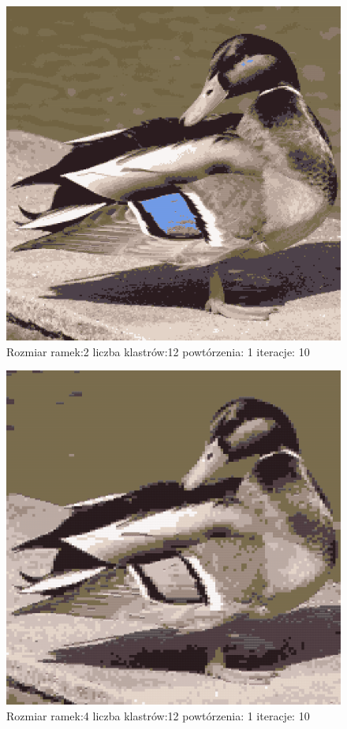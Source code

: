 \documentclass{classrep}
\begin{document}
{{{{\begin{figure}[!htbp]
\centering
\includegraphics[width=\textwidth,width=90mm]{obrazy/duck_R2_K12_P1_It10.png}
\caption{Rozmiar ramek:2 liczba klastrów:12 powtórzenia: 1 iteracje: 10 }
\end{figure}

\begin{figure}[!htbp]
\centering
\includegraphics[width=\textwidth,width=90mm]{obrazy/duck_R4_K12_P1_It10.png}
\caption{Rozmiar ramek:4 liczba klastrów:12 powtórzenia: 1 iteracje: 10 }
\end{figure}

}}}}
\end{document}
